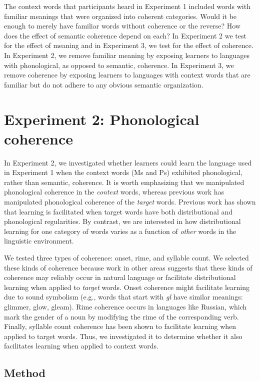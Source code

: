 \documentclass[man,floatsintext]{apa6}
\begin{document}
The context words that participants heard in Experiment 1 included words with familiar meanings that were organized into coherent categories. Would it be enough to merely have familiar words without coherence or the reverse? How does the effect of semantic coherence depend on each? In Experiment 2 we test for the effect of meaning and in Experiment 3, we test for the effect of coherence. In Experiment 2, we remove familiar meaning by exposing learners to languages with phonological, as opposed to semantic, coherence. In Experiment 3, we remove coherence by exposing learners to languages with context words that are familiar but do not adhere to any obvious semantic organization.

\section{Experiment 2: Phonological coherence}

In Experiment 2, we investigated whether learners could learn the language used in  Experiment 1 when the context words (Ms and Ps) exhibited phonological, rather than semantic, coherence. It is worth emphasizing that we manipulated phonological coherence in the \emph{context} words, whereas previous work has manipulated phonological coherence of the \emph{target} words. Previous work has shown that learning is facilitated when target words have both distributional and phonological regularities. By contrast, we are interested in how distributional learning for one category of words varies as a function of \emph{other} words in the linguistic environment.

We tested three types of coherence: onset, rime, and syllable count. We selected these kinds of coherence because work in other areas suggests that these kinds of coherence may reliably occur in natural language or facilitate distributional learning when applied to \emph{target} words. Onset coherence might facilitate learning due to sound symbolism (e.g., words that start with \emph{gl} have similar meanings: glimmer, glow, gleam). Rime coherence occurs in languages like Russian, which mark the gender of a noun by modifying the rime of the corresponding verb. Finally, syllable count coherence has been shown to facilitate learning when applied to target words. Thus, we investigated it to determine whether it also facilitates learning when applied to context words.

\subsection{Method}
\end{document}
